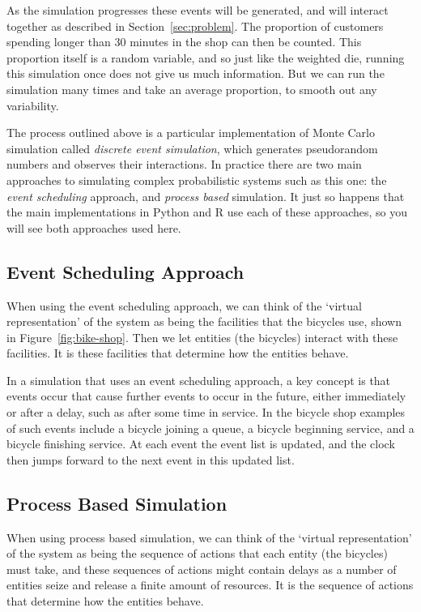 As the simulation progresses these events will be generated, and will interact
together as described in Section~\ref{sec:problem}.
The proportion of customers spending longer than 30 minutes in the shop can then
be counted. This proportion itself is a random variable, and so just like the
weighted die, running this simulation once does not give us much information.
But we can run the simulation many times and take an average proportion, to
smooth out any variability.

The process outlined above is a particular implementation of Monte Carlo
simulation called \textit{discrete event simulation}, which generates
pseudorandom numbers and observes their interactions. In practice there are two
main approaches to simulating complex probabilistic systems such as this one:
the \textit{event scheduling} approach, and \textit{process based} simulation.
It just so happens that the main implementations in Python and R use each of
these approaches, so you will see both approaches used here.


\subsection{Event Scheduling Approach}
When using the event scheduling approach, we can think of the `virtual
representation' of the system as being the facilities that the bicycles use,
shown in Figure~\ref{fig:bike-shop}. Then we
let entities (the bicycles) interact with these facilities. It is these
facilities that determine how the entities behave.

In a simulation that uses an event scheduling approach, a key concept is that
events occur that cause further events to occur in the future, either
immediately or after a delay, such as after some time in service.
In the bicycle shop examples of such events include a bicycle joining a queue, a
bicycle beginning service, and a bicycle finishing service. At each event the
event list is updated, and the clock then jumps forward to the next event in
this updated list.

\subsection{Process Based Simulation}
When using process based simulation, we can think of the `virtual
representation' of the system as being the sequence of actions that each entity
(the bicycles) must take, and these sequences of actions might contain delays as
a number of entities seize and release a finite amount of resources. It is the
sequence of actions that determine how the entities behave.

